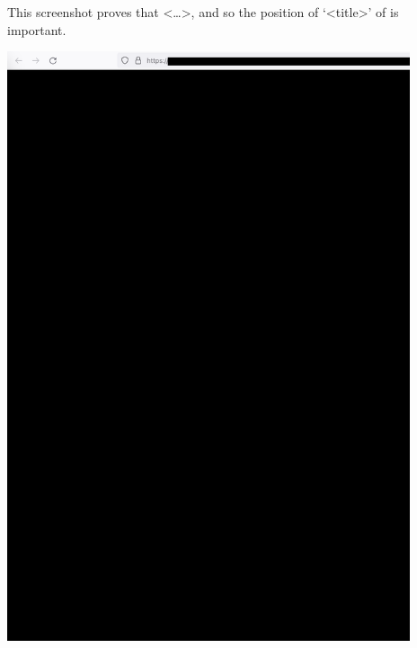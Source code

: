 
This screenshot proves that <\dots>,
and so the position of `<title>' of \MrPhpTwo is important.

\begin{center}
    \includegraphics[width=32em]{php-two-company-about_public}
\end{center}

\pagebreak
